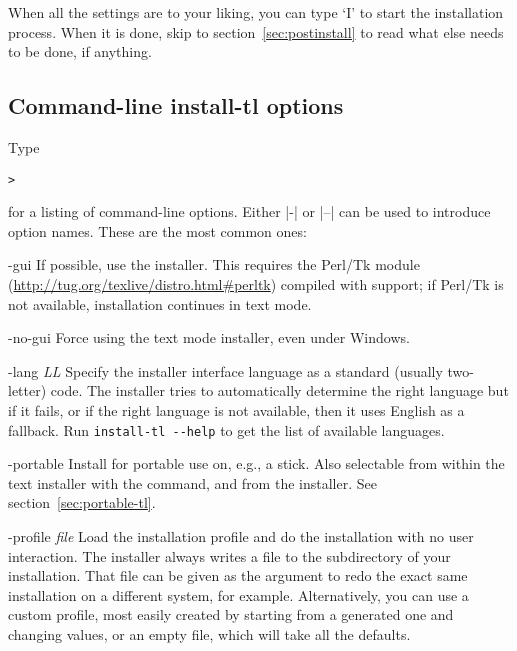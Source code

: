 \documentclass{article}
\begin{document}
When all the settings are to your liking, you can type `I' to start the
installation process. When it is done, skip to
section~\ref{sec:postinstall} to read what else needs to be done, if
anything.

\subsection{Command-line install-tl options}
\label{sec:cmdline}

Type
\begin{alltt}
> 
\end{alltt}
for a listing of command-line options.  Either |-| or |--| can be used
to introduce option names.  These are the most common ones:

\begin{ttdescription}
\item[-gui] If possible, use the \GUI{} installer. This requires the
  Perl/Tk module (\url{http://tug.org/texlive/distro.html#perltk})
  compiled with  support; if Perl/Tk is not available,
  installation continues in text mode.

\item[-no-gui] Force using the text mode installer, even under
  Windows.

\item[-lang {\sl LL}] Specify the installer interface
  language as a standard (usually two-letter) code.  The installer tries
  to automatically determine the right language but if it fails, or if
  the right language is not available, then it uses English as a
  fallback.  Run \verb|install-tl --help| to get the list of available
  languages.

\item[-portable] Install for portable use on, e.g., a \USB{} stick.
  Also selectable from within the text installer with the 
  command, and from the \GUI{} installer.  See
  section~\ref{sec:portable-tl}.

\item[-profile {\sl file}] Load the installation profile  and
  do the installation with no user interaction.  The installer always
  writes a file  to the 
  subdirectory of your installation.  That file can be given as the
  argument to redo the exact same installation on a different system,
  for example.  Alternatively, you can use a custom profile, most easily
  created by starting from a generated one and changing values, or an
  empty file, which will take all the defaults.


\end{ttdescription}
\end{document}
